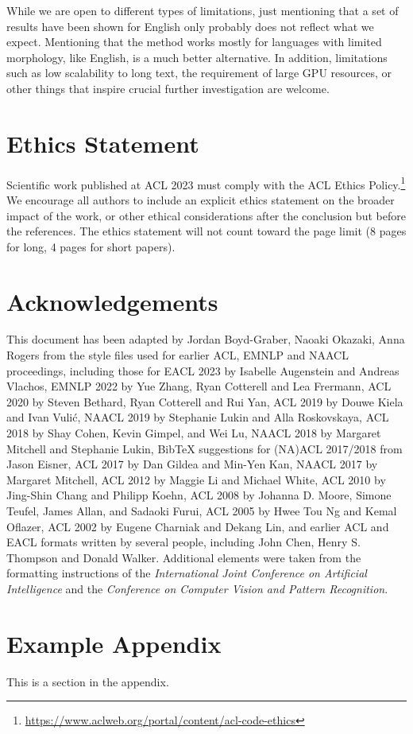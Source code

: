 \documentclass[11pt]{article}
\begin{document}
While we are open to different types of limitations, just mentioning that a set of results have been shown for English only probably does not reflect what we expect.
Mentioning that the method works mostly for languages with limited morphology, like English, is a much better alternative.
In addition, limitations such as low scalability to long text, the requirement of large GPU resources, or other things that inspire crucial further investigation are welcome.

\section*{Ethics Statement}
Scientific work published at ACL 2023 must comply with the ACL Ethics Policy.\footnote{\url{https://www.aclweb.org/portal/content/acl-code-ethics}} We encourage all authors to include an explicit ethics statement on the broader impact of the work, or other ethical considerations after the conclusion but before the references. The ethics statement will not count toward the page limit (8 pages for long, 4 pages for short papers).

\section*{Acknowledgements}
This document has been adapted by Jordan Boyd-Graber, Naoaki Okazaki, Anna Rogers from the style files used for earlier ACL, EMNLP and NAACL proceedings, including those for
EACL 2023 by Isabelle Augenstein and Andreas Vlachos,
EMNLP 2022 by Yue Zhang, Ryan Cotterell and Lea Frermann,
ACL 2020 by Steven Bethard, Ryan Cotterell and Rui Yan,
ACL 2019 by Douwe Kiela and Ivan Vuli\'{c},
NAACL 2019 by Stephanie Lukin and Alla Roskovskaya,
ACL 2018 by Shay Cohen, Kevin Gimpel, and Wei Lu,
NAACL 2018 by Margaret Mitchell and Stephanie Lukin,
Bib\TeX{} suggestions for (NA)ACL 2017/2018 from Jason Eisner,
ACL 2017 by Dan Gildea and Min-Yen Kan, NAACL 2017 by Margaret Mitchell,
ACL 2012 by Maggie Li and Michael White,
ACL 2010 by Jing-Shin Chang and Philipp Koehn,
ACL 2008 by Johanna D. Moore, Simone Teufel, James Allan, and Sadaoki Furui,
ACL 2005 by Hwee Tou Ng and Kemal Oflazer,
ACL 2002 by Eugene Charniak and Dekang Lin,
and earlier ACL and EACL formats written by several people, including
John Chen, Henry S. Thompson and Donald Walker.
Additional elements were taken from the formatting instructions of the \emph{International Joint Conference on Artificial Intelligence} and the \emph{Conference on Computer Vision and Pattern Recognition}.




\appendix

\section{Example Appendix}
\label{sec:appendix}

This is a section in the appendix.
\end{document}
